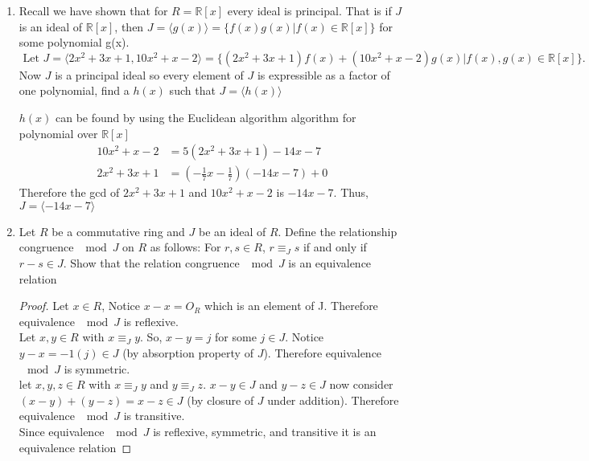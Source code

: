 \documentclass{article}
\newcommand{\R}{\mathbb{R}}
\begin{document}
\begin{enumerate}
		\item Recall we have shown that for $R=\R[x]$ every ideal is principal.
		That is if $J$ is an ideal of $\R[x]$, then $J = \langle g(x) \rangle = \{ f(x)g(x) | f(x) \in \R[x]\}$ for some polynomial g(x).
		$$\text{ Let } J = \langle 2x^2+3x+1, 10x^2+x-2 \rangle = \{ ( 2x^2+3x+1)f(x) + (10x^2+x-2)g(x)|f(x),g(x) \in \R[x] \}. $$
		Now $J$ is a principal ideal so every element of $J$ is expressible as a factor of one polynomial, find a $h(x)$ such that $J = \langle h(x)\rangle$
		
		$h(x)$ can be found by using the Euclidean algorithm algorithm for polynomial over $\R[x]$ 
		\begin{align*}
			10x^2 + x - 2 &= 5(2x^2 + 3x + 1) -14x - 7\\
			2x^2 + 3x + 1 &= (-\frac{1}{7}x - \frac{1}{7})(-14x - 7) + 0
		\end{align*}
		Therefore the gcd of $2x^2+3x+1$ and $10x^2+x-2$ is $-14x - 7$. Thus, $J = \langle -14x - 7\rangle$   
		
		\pagebreak
		\item Let $R$ be a commutative ring and $J$ be an ideal of $R$. Define the relationship congruence $\mod J$ on $R$ as follows:
		For $r, s \in R$, $r \equiv_J s$ if and only if $r - s \in J$.
		Show that the relation congruence $\mod J$ is an equivalence relation
		\begin{proof}
			Let $x \in R$, Notice $x-x = O_R$ which is an element of J. Therefore equivalence $\mod J$ is reflexive.\\
			
			Let $x, y \in R$ with $x \equiv_J y$. So, $x-y = j$ for some $j \in J$. Notice $y-x =-1(j) \in J$ (by absorption property of $J$). 
			Therefore equivalence $\mod J$ is symmetric.\\  
			
			let $x, y, z \in R$ with $x \equiv_J y$ and $y \equiv_J z$. $x-y \in  J$ and  $y-z \in J$ now consider $(x-y) + (y-z) = x-z \in  J$ (by closure of $J$ under addition).
			Therefore equivalence $\mod J$ is transitive.\\
			Since equivalence $\mod J$ is reflexive, symmetric, and transitive it is an equivalence relation

		\end{proof}
	

\end{enumerate}
\end{document}
